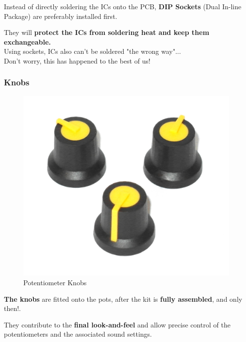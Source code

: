 \documentclass{scrartcl}
\begin{document}
Instead of directly soldering the ICs onto the PCB, \textbf{DIP Sockets} (Dual In-line Package) are preferably installed first.

They will \textbf{protect the ICs from soldering heat and keep them exchangeable.} \\
Using sockets, ICs also can't be soldered "the wrong way"... \\
Don't worry, this has happened to the best of us!

\subsubsection{Knobs}

\begin{figure}[!ht]
    \begin{center}
        \includegraphics[scale=0.20]{assets/zekit-knobs.jpg}
        \caption{Potentiometer Knobs}
    \end{center}
\end{figure}

\textbf{The knobs} are fitted onto the pots, after the kit is \textbf{fully assembled}, and only then!.

They contribute to the \textbf{final look-and-feel} and allow precise control of the potentiometers and the associated sound settings.

\pagebreak

\end{document}
